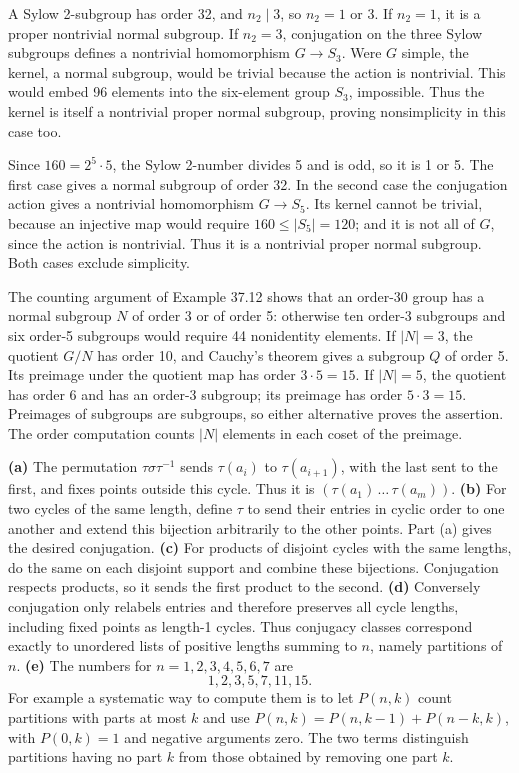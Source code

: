 A Sylow 2-subgroup has order 32, and $n_2\mid3$, so $n_2=1$ or 3.
If $n_2=1$, it is a proper nontrivial normal subgroup.
If $n_2=3$, conjugation on the three Sylow subgroups defines a nontrivial homomorphism $G\to S_3$. Were $G$ simple, the kernel, a normal subgroup, would be trivial because the action is nontrivial. This would embed 96 elements into the six-element group $S_3$, impossible. Thus the kernel is itself a nontrivial proper normal subgroup, proving nonsimplicity in this case too.

Since $160=2^5\cdot5$, the Sylow 2-number divides 5 and is odd, so it is 1 or 5. The first case gives a normal subgroup of order 32.
In the second case the conjugation action gives a nontrivial homomorphism $G\to S_5$. Its kernel cannot be trivial, because an injective map would require $160\le|S_5|=120$; and it is not all of $G$, since the action is nontrivial. Thus it is a nontrivial proper normal subgroup. Both cases exclude simplicity.

The counting argument of Example 37.12 shows that an order-30 group has a normal subgroup $N$ of order 3 or of order 5: otherwise ten order-3 subgroups and six order-5 subgroups would require 44 nonidentity elements.
If $|N|=3$, the quotient $G/N$ has order 10, and Cauchy's theorem gives a subgroup $Q$ of order 5. Its preimage under the quotient map has order $3\cdot5=15$.
If $|N|=5$, the quotient has order 6 and has an order-3 subgroup; its preimage has order $5\cdot3=15$.
Preimages of subgroups are subgroups, so either alternative proves the assertion. The order computation counts $|N|$ elements in each coset of the preimage.

\textbf{(a)} The permutation $\tau\sigma\tau^{-1}$ sends $\tau(a_i)$ to $\tau(a_{i+1})$, with the last sent to the first, and fixes points outside this cycle. Thus it is $(\tau(a_1)\,\ldots\,\tau(a_m))$.
\textbf{(b)} For two cycles of the same length, define $\tau$ to send their entries in cyclic order to one another and extend this bijection arbitrarily to the other points. Part (a) gives the desired conjugation.
\textbf{(c)} For products of disjoint cycles with the same lengths, do the same on each disjoint support and combine these bijections. Conjugation respects products, so it sends the first product to the second.
\textbf{(d)} Conversely conjugation only relabels entries and therefore preserves all cycle lengths, including fixed points as length-1 cycles. Thus conjugacy classes correspond exactly to unordered lists of positive lengths summing to $n$, namely partitions of $n$.
\textbf{(e)} The numbers for $n=1,2,3,4,5,6,7$ are
\[
1,2,3,5,7,11,15.
\]
For example a systematic way to compute them is to let $P(n,k)$ count partitions with parts at most $k$ and use $P(n,k)=P(n,k-1)+P(n-k,k)$, with $P(0,k)=1$ and negative arguments zero. The two terms distinguish partitions having no part $k$ from those obtained by removing one part $k$.

